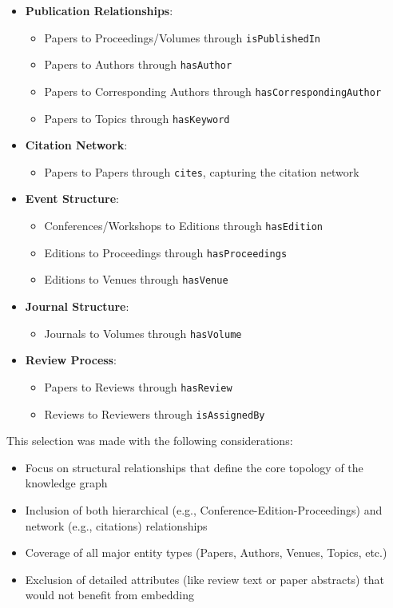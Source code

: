 \documentclass[10pt,a4paper]{article}
\begin{document}
\begin{itemize}
    \item \textbf{Publication Relationships}:
    \begin{itemize}
        \item Papers to Proceedings/Volumes through \texttt{isPublishedIn}
        \item Papers to Authors through \texttt{hasAuthor}
        \item Papers to Corresponding Authors through \texttt{hasCorrespondingAuthor}
        \item Papers to Topics through \texttt{hasKeyword}
    \end{itemize}
    
    \item \textbf{Citation Network}:
    \begin{itemize}
        \item Papers to Papers through \texttt{cites}, capturing the citation network
    \end{itemize}
    
    \item \textbf{Event Structure}:
    \begin{itemize}
        \item Conferences/Workshops to Editions through \texttt{hasEdition}
        \item Editions to Proceedings through \texttt{hasProceedings}
        \item Editions to Venues through \texttt{hasVenue}
    \end{itemize}
    
    \item \textbf{Journal Structure}:
    \begin{itemize}
        \item Journals to Volumes through \texttt{hasVolume}
    \end{itemize}
    
    \item \textbf{Review Process}:
    \begin{itemize}
        \item Papers to Reviews through \texttt{hasReview}
        \item Reviews to Reviewers through \texttt{isAssignedBy}
    \end{itemize}
\end{itemize}

This selection was made with the following considerations:
\begin{itemize}
    \item Focus on structural relationships that define the core topology of the knowledge graph
    \item Inclusion of both hierarchical (e.g., Conference-Edition-Proceedings) and network (e.g., citations) relationships
    \item Coverage of all major entity types (Papers, Authors, Venues, Topics, etc.)
    \item Exclusion of detailed attributes (like review text or paper abstracts) that would not benefit from embedding
\end{itemize}
\end{document}
